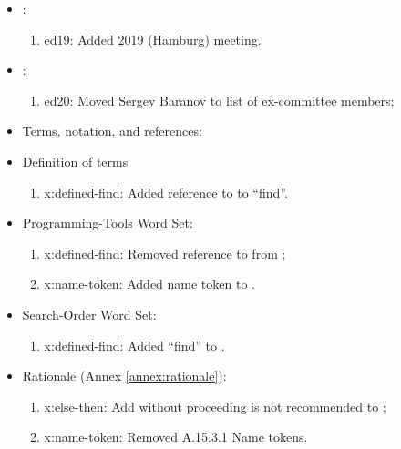 	\begin{itemize}
	\item {}:					%
	\begin{enumerate}
		\item \textsf{ed19}: Added 2019 (Hamburg) meeting.
	\end{enumerate}

	\item {}:					%
	\begin{enumerate}
		\item \textsf{ed20}: Moved Sergey Baranov to list of ex-committee members;
	\end{enumerate}

	\item[2] Terms, notation, and references:	%
	\item[\ref{notation:terms}] Definition of terms
	\begin{enumerate}
	\item \textsf{x:defined-find}: Added reference to  to ``find''.
	\end{enumerate}

	\item[15] Programming-Tools Word Set:	%
	\begin{enumerate}
	\item \textsf{x:defined-find}: Removed reference to  from ;
	\item \textsf{x:name-token}: Added name token to .
	\end{enumerate}

	\item[16] Search-Order Word Set:		%
	\begin{enumerate}
	\item \textsf{x:defined-find}: Added ``find'' to .
	\end{enumerate}

	\item[A] Rationale (Annex \ref{annex:rationale}):	%
	\begin{enumerate}
	\item \textsf{x:else-then}: Add \word[tools]{[ELSE]} without proceeding \word[tools]{[IF]} is not
		recommended to ;
	\item \textsf{x:name-token}: Removed A.15.3.1 Name tokens.
	\end{enumerate}
\end{itemize}

